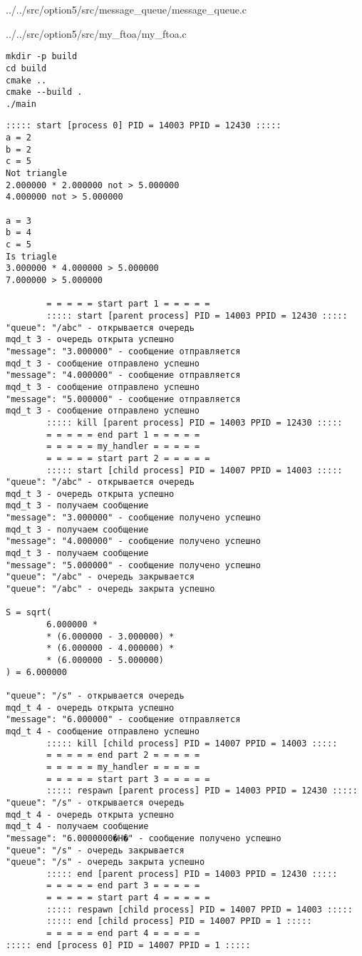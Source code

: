 
{../../src/option5/src/message_queue/message_queue.c}


{../../src/option5/src/my_ftoa/my_ftoa.c}

\newpage

\begin{lstlisting}[language=Terminal,]
mkdir -p build
cd build
cmake ..
cmake --build .
./main
\end{lstlisting}

\begin{lstlisting}[language=Out,]
::::: start [process 0] PID = 14003 PPID = 12430 :::::
a = 2
b = 2
c = 5
Not triangle
2.000000 * 2.000000 not > 5.000000
4.000000 not > 5.000000

a = 3
b = 4
c = 5
Is triagle
3.000000 * 4.000000 > 5.000000
7.000000 > 5.000000

        = = = = = start part 1 = = = = =
        ::::: start [parent process] PID = 14003 PPID = 12430 :::::
"queue": "/abc" - открывается очередь
mqd_t 3 - очередь открыта успешно
"message": "3.000000" - сообщение отправляется
mqd_t 3 - сообщение отправлено успешно
"message": "4.000000" - сообщение отправляется
mqd_t 3 - сообщение отправлено успешно
"message": "5.000000" - сообщение отправляется
mqd_t 3 - сообщение отправлено успешно
        ::::: kill [parent process] PID = 14003 PPID = 12430 :::::
        = = = = = end part 1 = = = = =
        = = = = = my_handler = = = = =
        = = = = = start part 2 = = = = =
        ::::: start [child process] PID = 14007 PPID = 14003 :::::
"queue": "/abc" - открывается очередь
mqd_t 3 - очередь открыта успешно
mqd_t 3 - получаем сообщение
"message": "3.000000" - сообщение получено успешно
mqd_t 3 - получаем сообщение
"message": "4.000000" - сообщение получено успешно
mqd_t 3 - получаем сообщение
"message": "5.000000" - сообщение получено успешно
"queue": "/abc" - очередь закрывается
"queue": "/abc" - очередь закрыта успешно

S = sqrt(
        6.000000 *
        * (6.000000 - 3.000000) *
        * (6.000000 - 4.000000) *
        * (6.000000 - 5.000000)
) = 6.000000

"queue": "/s" - открывается очередь
mqd_t 4 - очередь открыта успешно
"message": "6.000000" - сообщение отправляется
mqd_t 4 - сообщение отправлено успешно
        ::::: kill [child process] PID = 14007 PPID = 14003 :::::
        = = = = = end part 2 = = = = =
        = = = = = my_handler = = = = =
        = = = = = start part 3 = = = = =
        ::::: respawn [parent process] PID = 14003 PPID = 12430 :::::
"queue": "/s" - открывается очередь
mqd_t 4 - очередь открыта успешно
mqd_t 4 - получаем сообщение
"message": "6.0000000�H�" - сообщение получено успешно
"queue": "/s" - очередь закрывается
"queue": "/s" - очередь закрыта успешно
        ::::: end [parent process] PID = 14003 PPID = 12430 :::::
        = = = = = end part 3 = = = = =
        = = = = = start part 4 = = = = =
        ::::: respawn [child process] PID = 14007 PPID = 14003 :::::
        ::::: end [child process] PID = 14007 PPID = 1 :::::
        = = = = = end part 4 = = = = =
::::: end [process 0] PID = 14007 PPID = 1 :::::
\end{lstlisting}